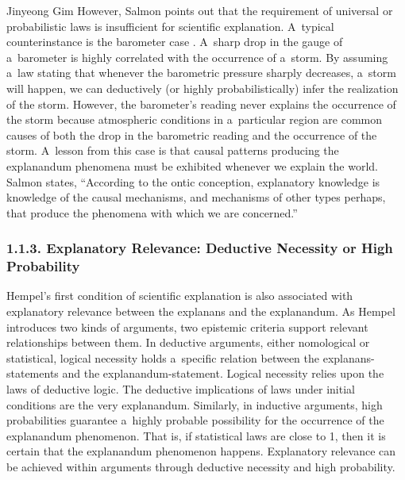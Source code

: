 \begin{artengenv}{Jinyeong Gim}
However, Salmon points out that the requirement of universal or probabilistic laws is insufficient for scientific explanation. A~typical counterinstance is the barometer case
\parencite[][p.47]{salmon_four_1989}. %
 A~sharp drop in the gauge of a~barometer is highly correlated with the occurrence of a~storm. By assuming a~law stating that whenever the barometric pressure sharply decreases, a~storm will happen, we can deductively (or highly probabilistically) infer the realization of the storm. However, the barometer's reading never explains the occurrence of the storm because atmospheric conditions in a~particular region are common causes of both the drop in the barometric reading and the occurrence of the storm. A~lesson from this case is that causal patterns producing the explanandum phenomena must be exhibited whenever we explain the world. Salmon 
\parencite*[][p.128]{salmon_four_1989} %
 states, ``According to the ontic conception, explanatory knowledge is knowledge of the causal mechanisms, and mechanisms of other types perhaps, that produce the phenomena with which we are concerned.''

\subsubsection{1.1.3. Explanatory Relevance: Deductive Necessity or High Probability}

Hempel's first condition of scientific explanation is also associated with explanatory relevance between the explanans and the explanandum. As Hempel introduces two kinds of arguments, two epistemic criteria support relevant relationships between them. In deductive arguments, either nomological or statistical, logical necessity holds a~specific relation between the explanans-statements and the explanandum-statement. Logical necessity relies upon the laws of deductive logic. The deductive implications of laws under initial conditions are the very explanandum. Similarly, in inductive arguments, high probabilities guarantee a~highly probable possibility for the occurrence of the explanandum phenomenon. That is, if statistical laws are close to 1, then it is certain that the explanandum phenomenon happens. Explanatory relevance can be achieved within arguments through deductive necessity and high probability.


\end{artengenv}
